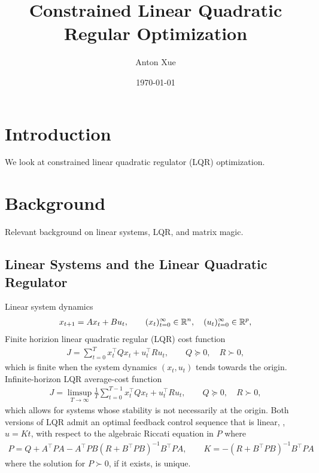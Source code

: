 \documentclass[12pt]{article}
\title{Constrained Linear Quadratic Regular Optimization}
\author{Anton Xue}
\date{\today}
\date{}
\begin{document}
\maketitle

\section{Introduction}
We look at constrained linear quadratic regulator (LQR) optimization.

\section{Background}
Relevant background on linear systems, LQR, and matrix magic.

\subsection{Linear Systems and the Linear Quadratic Regulator}
Linear system dynamics
\begin{align*}
  x_{t + 1} = A x_t + B u_t,
    \qquad (x_t)_{t = 0}^{\infty} \in {\mathbb{R}}^n,
    \quad (u_t)_{t = 0}^{\infty} \in {\mathbb{R}}^p,
\end{align*}
Finite horizion linear quadratic regular (LQR) cost function
\begin{align*}
  J = \sum_{t = 0}^{T} x_t ^\top Q x_t + u_t ^\top R u_t,
    \qquad
    Q \succeq 0, \quad R \succ 0,
\end{align*}
which is finite when the system dynamics \((x_t, u_t)\)
tends towards the origin.
Infinite-horizon LQR average-cost function
\begin{align*}
  J = \limsup_{T \to \infty} \frac{1}{T} \sum_{t = 0}^{T - 1}
        x_t ^\top Q x_t + u_t ^\top R u_t,
    \qquad
    Q \succeq 0, \quad R \succ 0,
\end{align*}
which allows for systems whose stability is not necessarily at the origin.
Both versions of LQR admit an optimal feedback control sequence
that is linear, \ie, \(u = Kt\),
with respect to the algebraic Riccati equation in \(P\) where
\begin{align*}
  P = Q + A^\top P A - A^\top P B (R + B^\top P B)^{-1} B^\top P A,
    \qquad K = -(R + B^\top P B)^{-1} B^\top P A
\end{align*}
where the solution for \(P \succ 0\), if it exists, is unique.
\end{document}
